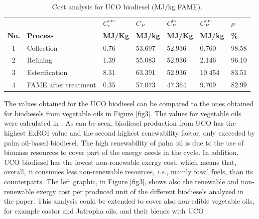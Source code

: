 \documentclass[sustainability,article,accept,moreauthors,pdftex,12pt,a4paper]{mdpi}
\newcommand{\ems}[3][\phantom{\ast}]{\ensuremath{{#2}_{#3}^\mathrm{#1}}}
\begin{document}
\begin{table}[H]
 \centering
 \caption[Cost analysis for UCO biodisel]{Cost analysis for UCO biodiesel (MJ/kg FAME).}
 \begin{tabularx}{0.8\textwidth}{clZZZZZ}
 \toprule
  &       & \boldmath$\ems[nrs]{C}{e}$ & \boldmath$C_P$ & \boldmath$\ems[rs]{C}{P}$ & \boldmath$\ems[nrs]{C}{P}$ & \boldmath$\rho$ \\
 \textbf{No. } &\textbf{ Process     }& \textbf{MJ/Kg } & \textbf{MJ/kg} & \textbf{MJ/Kg} & \textbf{MJ/kg} & \textbf{\%} \\
  & Collection   & 0.76 & 53.697 & 52.936 & 0.760 & 98.58 \\
 2 & Refining    & 1.39 & 55.083 & 52.936 & 2.146 & 96.10 \\
 3 & Esterification  & 8.31 & 63.391 & 52.936 & 10.454 & 83.51 \\
 4 & FAME after treatment & 0.35 & 57.073 & 47.364 & 9.709 & 82.99 \\
 \bottomrule
 \end{tabularx}%
 \label{table5}%
\end{table}%

The values obtained for the UCO biodiesel can be compared to the ones obtained for biodiesels from vegetable oils in Figure \ref{fig3}. The values for vegetable oils were calculated in \cite{FontdeMoraThesis2013}. As can be seen, biodiesel production from UCO has the highest ExROI value and the second highest renewability factor, only exceeded by palm oil-based biodiesel. The high renewability of palm oil is due to the use of biomass resources to cover part of the energy needs in the cycle. In addition, UCO biodiesel has the lowest non-renewable exergy cost, which means that, overall, it consumes less non-renewable resources, \textit{i.e.}, mainly fossil fuels, than its counterparts. The left graphic, in Figure \ref{fig3}, shows also the renewable and non-renewable exergy cost per produced unit of the different biodiesels analyzed in the paper. This analysis could be extended to cover also non-edible vegetable oils, for example castor and Jatropha oils, and their blends with UCO \cite{Kannan2013}.
\end{document}
